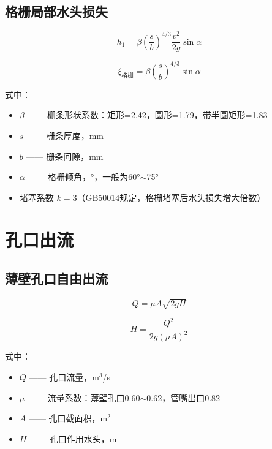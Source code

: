 \documentclass[12pt,a4paper]{ctexart}
\begin{document}
\subsection{格栅局部水头损失}

\begin{equation}
    h_1 = \beta \left( \frac{s}{b} \right)^{4/3} \frac{v^2}{2g} \sin\alpha
    \label{eq:grid}
\end{equation}

\begin{equation}
    \xi_{\text{格栅}} = \beta \left( \frac{s}{b} \right)^{4/3} \sin\alpha
    \label{eq:grid_xi}
\end{equation}

式中：
\begin{itemize}[nosep]
    \item $\beta$ —— 栅条形状系数：矩形=2.42，圆形=1.79，带半圆矩形=1.83
    \item $s$ —— 栅条厚度，mm
    \item $b$ —— 栅条间隙，mm
    \item $\alpha$ —— 格栅倾角，°，一般为60°$\sim$75°
    \item 堵塞系数 $k=3$（GB50014规定，格栅堵塞后水头损失增大倍数）
\end{itemize}

\section{孔口出流}

\subsection{薄壁孔口自由出流}

\begin{equation}
    Q = \mu A \sqrt{2g H}
    \label{eq:orifice}
\end{equation}

\begin{equation}
    H = \frac{Q^2}{2g (\mu A)^2}
    \label{eq:orifice_h}
\end{equation}

式中：
\begin{itemize}[nosep]
    \item $Q$ —— 孔口流量，m$^3$/s
    \item $\mu$ —— 流量系数：薄壁孔口0.60$\sim$0.62，管嘴出口0.82
    \item $A$ —— 孔口截面积，m$^2$
    \item $H$ —— 孔口作用水头，m
\end{itemize}
\end{document}
